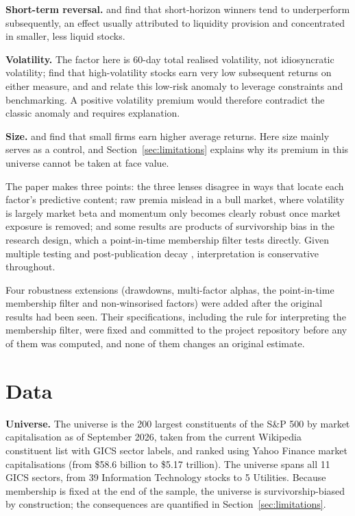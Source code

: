 \documentclass[11pt,a4paper]{article}
\begin{document}
\textbf{Short-term reversal.} \citet{jegadeesh1990} and \citet{lehmann1990} find that short-horizon winners tend to underperform subsequently, an effect usually attributed to liquidity provision and concentrated in smaller, less liquid stocks.

\textbf{Volatility.} The factor here is 60-day total realised volatility, not idiosyncratic volatility; \citet{ang2006} find that high-volatility stocks earn very low subsequent returns on either measure, and \citet{baker2011} and \citet{frazzini2014} relate this low-risk anomaly to leverage constraints and benchmarking. A positive volatility premium would therefore contradict the classic anomaly and requires explanation.

\textbf{Size.} \citet{banz1981} and \citet{fama1992} find that small firms earn higher average returns. Here size mainly serves as a control, and Section~\ref{sec:limitations} explains why its premium in this universe cannot be taken at face value.

The paper makes three points: the three lenses disagree in ways that locate each factor's predictive content; raw premia mislead in a bull market, where volatility is largely market beta and momentum only becomes clearly robust once market exposure is removed; and some results are products of survivorship bias in the research design, which a point-in-time membership filter tests directly. Given multiple testing \citep{harvey2016} and post-publication decay \citep{mclean2016}, interpretation is conservative throughout.

Four robustness extensions (drawdowns, multi-factor alphas, the point-in-time membership filter and non-winsorised factors) were added after the original results had been seen. Their specifications, including the rule for interpreting the membership filter, were fixed and committed to the project repository before any of them was computed, and none of them changes an original estimate.

\section{Data}
\label{sec:data}

\textbf{Universe.} The universe is the 200 largest constituents of the S\&P 500 by market capitalisation as of September 2026, taken from the current Wikipedia constituent list with GICS sector labels, and ranked using Yahoo Finance market capitalisations (from \$58.6 billion to \$5.17 trillion). The universe spans all 11 GICS sectors, from 39 Information Technology stocks to 5 Utilities. Because membership is fixed at the end of the sample, the universe is survivorship-biased by construction; the consequences are quantified in Section~\ref{sec:limitations}.
\end{document}
